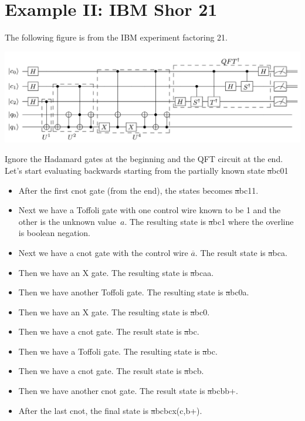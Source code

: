 \documentclass{article}
\begin{document}
\section{Example II: IBM Shor 21}

The following figure is from the IBM experiment factoring 21.

\includegraphics[scale=0.4]{ibmcircuit.png}

Ignore the Hadamard gates at the beginning and the QFT circuit at the
end. Let's start evaluating backwards starting from the partially
known state \st{a}{b}{c}{0}{1}

\begin{itemize}
\item After the first \textsf{cnot} gate (from the end), the states
  becomes \st{a}{b}{c}{1}{1}.
\item Next we have a Toffoli gate with one control wire known to be 1
  and the other is the unknown value~$a$. The resulting state
  is \st{a}{b}{c}{1}{} where the overline is boolean negation.
\item Next we have a \textsf{cnot} gate with the control wire
  $\overline{a}$. The result state is \st{a}{b}{c}{a}{}.
\item Then we have an \textsf{X} gate. The resulting state is
  \st{a}{b}{c}{a}{a}.
\item Then we have another \textsf{Toffoli} gate. The resulting state is
   \st{a}{b}{c}{0}{a}.
\item Then we have an \textsf{X} gate. The resulting state is
  \st{a}{b}{c}{0}{}.
\item Then we have a \textsf{cnot} gate. The result state is
    \st{a}{b}{c}{}{}.
\item Then we have a \textsf{Toffoli} gate. The resulting state is
   \st{a}{b}{c}{}{}.
\item Then we have a \textsf{cnot} gate. The result state is
      \st{a}{b}{c}{b}{}.
\item Then we have another \textsf{cnot} gate. The result state is
      \st{a}{b}{c}{b}{b+}.
\item After the last \textsf{cnot}, the final state is
      \st{a}{b}{c}{b}{\textsf{cx}(c,b+)}.
\end{itemize}
\end{document}
